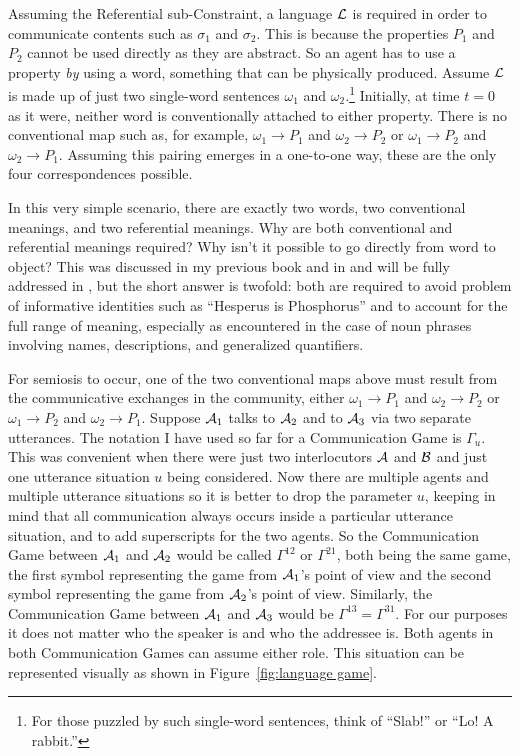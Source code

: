 Assuming the Referential sub-Constraint, a language $\cal L$ is required in order to communicate contents such as $\sigma_1$ and $\sigma_2$. This is because the properties $P_1$ and $P_2$ cannot be used directly as they are abstract. So an agent has to use a property \emph{by} using a word, something that can be physically produced. Assume $\cal L$ is made up of just two single-word sentences $\omega_1$ and $\omega_2$.\footnote{For those puzzled by such single-word sentences, think of  ``Slab!'' or  ``Lo! A rabbit.''} Initially, at time $t = 0$ as it were, neither word is conventionally attached to either property. There is no conventional map such as, for example, $\omega_1 \longrightarrow P_1$ and $\omega_2 \longrightarrow P_2$ or $\omega_1 \longrightarrow P_2$ and $\omega_2 \longrightarrow P_1$. Assuming this pairing emerges in a one-to-one way, these are the only four correspondences possible.

In this very simple scenario, there are exactly two words, two conventional meanings, and two referential meanings. Why are both conventional and referential meanings required? Why isn't it possible to go directly from word to object? This was discussed in my previous book and in  and will be fully addressed in , but the short answer is twofold: both are required to avoid  problem of informative identities such as ``Hesperus is Phosphorus'' and to account for the full range of meaning, especially as encountered in the case of noun phrases involving names, descriptions, and generalized quantifiers.

For semiosis to occur, one of the two conventional maps above must result from the communicative exchanges in the community, either $\omega_1 \longrightarrow P_1$ and $\omega_2 \longrightarrow P_2$ or $\omega_1 \longrightarrow P_2$ and $\omega_2 \longrightarrow P_1$. Suppose ${\cal A}_1$ talks to ${\cal A}_2$ and to ${\cal A}_3$ via two separate utterances. The notation I have used so far for a Communication Game is $\Gamma_u$. This was convenient when there were just two interlocutors $\cal A$ and $\cal B$ and just one utterance situation $u$ being considered. Now there are multiple agents and multiple utterance situations so it is better to drop the parameter $u$, keeping in mind that all communication always occurs inside a particular utterance situation, and to add superscripts for the two agents. So the Communication Game between ${\cal A}_1$ and ${\cal A}_2$ would be called $\Gamma^{12}$ or $\Gamma^{21}$, both being the same game, the first symbol representing the game from ${\cal A}_1$'s point of view and the second symbol representing the game from ${\cal A}_2$'s point of view. Similarly, the Communication Game between ${\cal A}_1$ and ${\cal A}_3$ would be $\Gamma^{13} = \Gamma^{31}$. For our purposes it does not matter who the speaker is and who the addressee is. Both agents in both Communication Games can assume either role. This situation can be represented visually as shown in Figure~\ref{fig:language game}.


